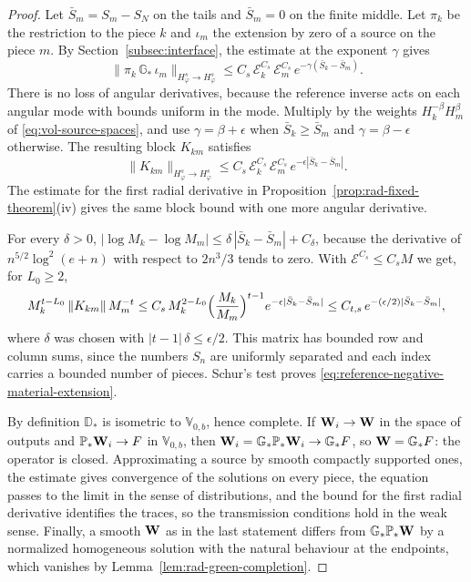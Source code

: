 \begin{proof}
Let $\bar S_m=S_m-S_N$ on the tails and $\bar S_m=0$ on the finite
middle. Let $\pi_k$ be the restriction to the piece $k$ and $\iota_m$
the extension by zero of a source on the piece $m$. By
Section~\ref{subsec:interface}, the estimate at the exponent $\gamma$
gives
\[
 \|\pi_k\,\mathbb G_*\,\iota_m\|_{H^s_\varphi\to H^s_\varphi}
 \le C_s\,\mathcal E_k^{C_s}\,\mathcal E_m^{C_s}\,
                        e^{-\gamma(\bar S_k-\bar S_m)} .
\]
There is no loss of angular derivatives, because the reference
inverse acts on each angular mode with bounds uniform in the mode.
Multiply by the weights $H_k^{-\beta}H_m^{\beta}$ of
\eqref{eq:vol-source-spaces}, and use $\gamma=\beta+\epsilon$ when
$\bar S_k\ge\bar S_m$ and $\gamma=\beta-\epsilon$ otherwise. The
resulting block $K_{km}$ satisfies
\begin{equation}\label{eq:global-two-weight-block-bound}
 \|K_{km}\|_{H^s_\varphi\to H^s_\varphi}
 \le C_s\,\mathcal E_k^{C_s}\,\mathcal E_m^{C_s}\,
                    e^{-\epsilon|\bar S_k-\bar S_m|} .
\end{equation}
The estimate for the first radial derivative in
Proposition~\ref{prop:rad-fixed-theorem}(iv) gives the same block
bound with one more angular derivative.

For every $\delta>0$,
$|\log M_k-\log M_m|\le\delta\,|\bar S_k-\bar S_m|+C_\delta$, because
the derivative of $n^{5/2}\log^2(e+n)$ with respect to $2n^3/3$ tends
to zero. With $\mathcal E^{C_s}\le C_sM$ we get, for $L_0\ge2$,
\[
 M_k^{t-L_0}\,\|K_{km}\|\,M_m^{-t}
 \le C_s\,M_k^{2-L_0}\Bigl(\frac{M_k}{M_m}\Bigr)^{t-1}
                         e^{-\epsilon|\bar S_k-\bar S_m|}
 \le C_{t,s}\,e^{-(\epsilon/2)|\bar S_k-\bar S_m|} ,
\]
where $\delta$ was chosen with $|t-1|\,\delta\le\epsilon/2$. This
matrix has bounded row and column sums, since the numbers $S_n$ are
uniformly separated and each index carries a bounded number of
pieces. Schur's test proves
\eqref{eq:reference-negative-material-extension}.

By definition $\mathbb D_*$ is isometric to $\mathbb V_{0,b}$, hence
complete. If $\mathbf W_i\to\mathbf W$ in the space of outputs and
$\mathbb P_*\mathbf W_i\to F$ in $\mathbb V_{0,b}$, then
$\mathbf W_i=\mathbb G_*\mathbb P_*\mathbf W_i\to\mathbb G_*F$, so
$\mathbf W=\mathbb G_*F$: the operator is closed. Approximating a source by
smooth compactly supported ones, the estimate gives convergence of
the solutions on every piece, the equation passes to the limit in the
sense of distributions, and the bound for the first radial derivative
identifies the traces, so the transmission conditions hold in the
weak sense. Finally, a smooth $\mathbf W$ as in the last statement differs
from $\mathbb G_*\mathbb P_*\mathbf W$ by a normalized homogeneous solution
with the natural behaviour at the endpoints, which vanishes by
Lemma~\ref{lem:rad-green-completion}.
\end{proof}


